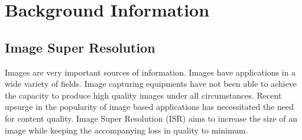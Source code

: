 \chapter{Background Information}
\section{Image Super Resolution}
Images are very important sources of information. Images have applications in a wide variety of fields. Image capturing equipments have not been able to achieve the capacity to produce high quality images under all circumstances. Recent upsurge in the popularity of image based applications has necessitated the need for content quality. Image Super Resolution (ISR) aims to increase the size of an image while keeping the accompanying loss in quality to minimum.




